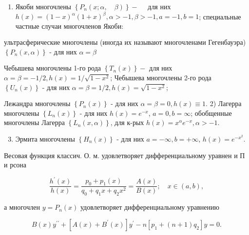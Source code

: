 \documentclass[10pt]{article}
\begin{document}
\begin{enumerate}

  \item Якоби многочлены $\left\{P_{n}(x ; \alpha, \quad \beta)\right\}-\quad$ для них $h(x)=(1-x)^{\alpha}(1+x)^{\beta}, \alpha>-1, \beta>-1, a=-1, b=1$; специальные частные случаи многочленов Якоби:

\end{enumerate}



ультрасферические многочлены (иногда их называют многочленами Гегенбауэра) $\left\{P_{n}(x, \alpha)\right\}$ - для них $\alpha=\beta$



Чебышева многочлены 1-го рода $\left\{T_{n}(x)\right\}-$ для них $\alpha=\beta=-1 / 2, h(x)=1 / \sqrt{1-x^{2}}$; Чебышева многочлены 2-го рода $\left\{U_{n}(x)\right\}$ - для них $\alpha=\beta=1 / 2, h(x)=\sqrt{1-x^{2}}$;



Лежандра многочлены $\left\{P_{n}(x)\right\}$ - для них $\alpha=\beta=0, h(x) \equiv 1$. 2) Лагерра многочлены $\left\{L_{n}(x)\right\}$ - для них $h(x)=e^{-x}$, $a=0, b=\infty$; обобщенные многочлены Лагерра $\left\{L_{n}(x, \alpha)\right\}$, для к-рых $h(x)=x^{\alpha} e^{-x}, \alpha>-1$.



\begin{enumerate}

  \setcounter{enumi}{2}

  \item Эрмита многочлены $\left\{H_{n}(x)\right\}$ - для них $a=-\infty, b=+\infty$, $h(x)=e^{-x^{2}}$.

\end{enumerate}



Весовая функция классич. О. м. удовлетворяет дифференциальному уравнен и П и рсона



\[

\frac{h^{\prime}(x)}{h(x)}=\frac{p_{0}+p_{1}(x)}{q_{0}+q_{1} x+q_{2} x^{2}}=\frac{A(x)}{B(x)} ; \quad x \in(a, b),

\]



а многочлен $y=P_{n}(x)$ удовлетворяет дифференциальному уравнению



\[

B(x) y^{\prime \prime}+\left[A(x)+B^{\prime}(x)\right] y^{\prime}-n\left[p_{1}+(n+1) q_{2}\right] y=0 .

\]
\end{document}
